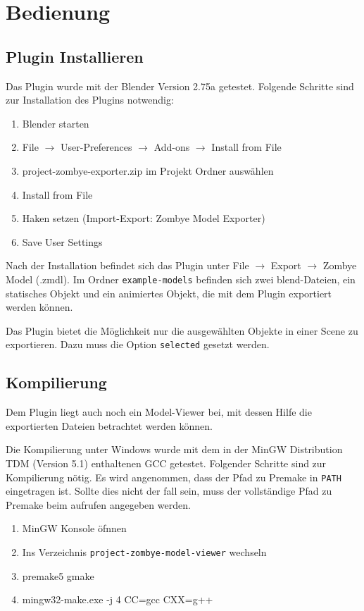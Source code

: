 \chapter{Bedienung}
\section{Plugin Installieren}
Das Plugin wurde mit der Blender Version 2.75a getestet. Folgende Schritte sind zur Installation des Plugins notwendig:

\begin{enumerate}
    \item Blender starten
    \item File $\rightarrow$ User-Preferences $\rightarrow$ Add-ons $\rightarrow$ Install from File
    \item project-zombye-exporter.zip im Projekt Ordner auswählen
    \item Install from File
    \item Haken setzen (Import-Export: Zombye Model Exporter)
    \item Save User Settings
\end{enumerate}

Nach der Installation befindet sich das Plugin unter File $\rightarrow$ Export $\rightarrow$ Zombye Model (.zmdl). Im Ordner \texttt{example-models} befinden sich zwei blend-Dateien, ein statisches Objekt und ein animiertes Objekt, die mit dem Plugin exportiert werden können.

Das Plugin bietet die Möglichkeit nur die ausgewählten Objekte in einer Scene zu exportieren. Dazu muss die Option \texttt{selected} gesetzt werden.

\section{Kompilierung}
Dem Plugin liegt auch noch ein Model-Viewer bei, mit dessen Hilfe die exportierten Dateien betrachtet werden können.

Die Kompilierung unter Windows wurde mit dem in der MinGW Distribution TDM (Version 5.1) enthaltenen GCC getestet. Folgender Schritte sind zur Kompilierung nötig. Es wird angenommen, dass der Pfad zu Premake in \texttt{PATH} eingetragen ist. Sollte dies nicht der fall sein, muss der vollständige Pfad zu Premake beim aufrufen angegeben werden.

\begin{enumerate}
    \item MinGW Konsole öfnnen
    \item Ins Verzeichnis \texttt{project-zombye-model-viewer} wechseln
    \item premake5 gmake
    \item mingw32-make.exe -j 4 CC=gcc CXX=g++
\end{enumerate}

